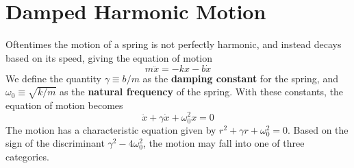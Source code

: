 \section{Damped Harmonic Motion}
Oftentimes the motion of a spring is not perfectly harmonic, and instead decays based on its speed, giving the equation of motion
\[ m\ddot x= -kx - b\dot x\]
We define the quantity $\gamma \equiv b/m$ as the \textbf{damping constant} for the spring, and $\omega_0 \equiv \sqrt{k/m}$ as the \textbf{natural frequency} of the spring. With these constants, the equation of motion becomes  
\[ \ddot x + \gamma \dot x + \omega_0^2 x = 0\]
The motion has a characteristic equation given by $r^2 + \gamma r + \omega_0^2 = 0$. Based on the sign of the discriminant $\gamma^2 -4 \omega_0^2$, the motion may fall into one of three categories.

